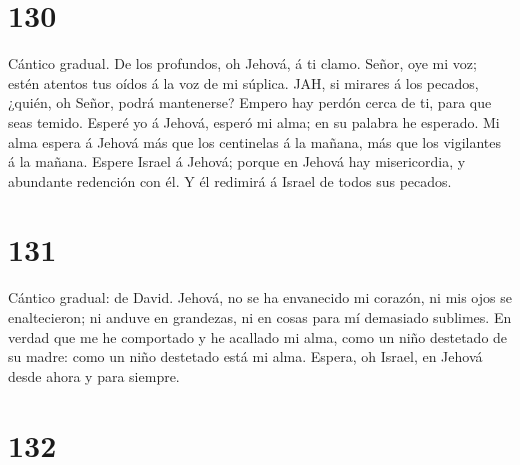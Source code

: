 \hypertarget{section-129}{%
\section{130}\label{section-129}}

 Cántico gradual. De los profundos, oh Jehová, á ti clamo.
 Señor, oye mi voz; estén atentos tus oídos á la voz de mi
súplica.  JAH, si mirares á los pecados, ¿quién, oh Señor,
podrá mantenerse?  Empero hay perdón cerca de ti, para que
seas temido.  Esperé yo á Jehová, esperó mi alma; en su
palabra he esperado.  Mi alma espera á Jehová más que los
centinelas á la mañana, más que los vigilantes á la mañana.
 Espere Israel á Jehová; porque en Jehová hay
misericordia, y abundante redención con él.  Y él redimirá
á Israel de todos sus pecados.

\hypertarget{section-130}{%
\section{131}\label{section-130}}

 Cántico gradual: de David. Jehová, no se ha envanecido mi
corazón, ni mis ojos se enaltecieron; ni anduve en grandezas, ni en
cosas para mí demasiado sublimes.  En verdad que me he
comportado y he acallado mi alma, como un niño destetado de su madre:
como un niño destetado está mi alma.  Espera, oh Israel,
en Jehová desde ahora y para siempre.

\hypertarget{section-131}{%
\section{132}\label{section-131}}


